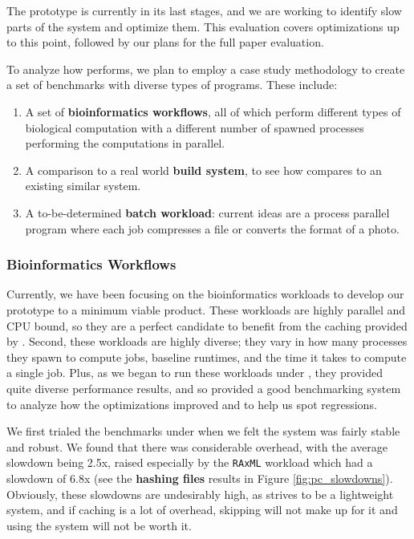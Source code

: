 The \pc prototype is currently in its last stages, and we are working to identify slow parts of the system and optimize them. This evaluation covers optimizations up to this point, followed by our plans for the full paper evaluation.

To analyze how \pc performs, we plan to employ a case study methodology to create a set of benchmarks with diverse types of programs. These include:
\begin{enumerate}
    \item A set of \textbf{bioinformatics workflows}, all of which perform different types of biological computation with a different number of spawned processes performing the computations in parallel.
    \item A comparison to a real world \textbf{build system}, to see how \pc compares to an existing similar system.
    \item A to-be-determined \textbf{batch workload}: current ideas are a process parallel program where each job compresses a file or converts the format of a photo.
\end{enumerate}

\subsubsection{Bioinformatics Workflows}
Currently, we have been focusing on the bioinformatics workloads to develop our \pc prototype to a minimum viable product. These workloads are highly parallel and CPU bound, so they are a perfect candidate to benefit from the caching provided by \pc. Second, these workloads are highly diverse; they vary in how many processes they spawn to compute jobs, baseline runtimes, and the time it takes to compute a single job. Plus, as we began to run these workloads under \pc, they provided quite diverse performance results, and so provided a good benchmarking system to analyze how the optimizations improved \pc and to help us spot regressions.

We first trialed the benchmarks under \pc when we felt the system was fairly stable and robust. We found that there was considerable overhead, with the average slowdown being 2.5x, raised especially by the \texttt{RAxML} workload which had a slowdown of 6.8x (see the \textbf{hashing files} results in Figure \ref{fig:pc_slowdowns}). Obviously, these slowdowns are undesirably high, as \pc strives to be a lightweight system, and if caching is a lot of overhead, skipping will not make up for it and using the system will not be worth it.

